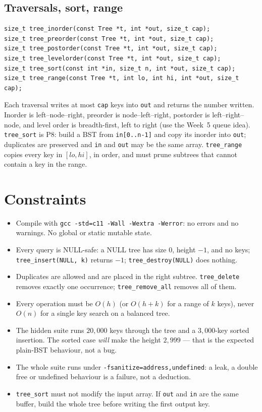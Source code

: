 \documentclass[11pt]{article}
\begin{document}
\subsection*{Traversals, sort, range}

\begin{verbatim}
size_t tree_inorder(const Tree *t, int *out, size_t cap);
size_t tree_preorder(const Tree *t, int *out, size_t cap);
size_t tree_postorder(const Tree *t, int *out, size_t cap);
size_t tree_levelorder(const Tree *t, int *out, size_t cap);
size_t tree_sort(const int *in, size_t n, int *out, size_t cap);
size_t tree_range(const Tree *t, int lo, int hi, int *out, size_t cap);
\end{verbatim}

Each traversal writes at most \texttt{cap} keys into \texttt{out} and returns the number written. Inorder is left--node--right, preorder is node--left--right, postorder is left--right--node, and level order is breadth-first, left to right (use the Week~5 queue idea). \texttt{tree\_sort} is P8: build a BST from \texttt{in[0..n-1]} and copy its inorder into \texttt{out}; duplicates are preserved and \texttt{in} and \texttt{out} may be the same array. \texttt{tree\_range} copies every key in $[lo,hi]$, in order, and must prune subtrees that cannot contain a key in the range.

\section{Constraints}

\begin{itemize}
  \item Compile with \texttt{gcc -std=c11 -Wall -Wextra -Werror}: no errors and no warnings. No global or static mutable state.
  \item Every query is NULL-safe: a NULL tree has size $0$, height $-1$, and no keys; \texttt{tree\_insert(NULL, k)} returns $-1$; \texttt{tree\_destroy(NULL)} does nothing.
  \item Duplicates are allowed and are placed in the right subtree. \texttt{tree\_delete} removes exactly one occurrence; \texttt{tree\_remove\_all} removes all of them.
  \item Every operation must be $O(h)$ (or $O(h+k)$ for a range of $k$ keys), never $O(n)$ for a single key search on a balanced tree.
  \item The hidden suite runs $20{,}000$ keys through the tree and a $3{,}000$-key sorted insertion. The sorted case \emph{will} make the height $2{,}999$ --- that is the expected plain-BST behaviour, not a bug.
  \item The whole suite runs under \texttt{-fsanitize=address,undefined}: a leak, a double free or undefined behaviour is a failure, not a deduction.
  \item \texttt{tree\_sort} must not modify the input array. If \texttt{out} and \texttt{in} are the same buffer, build the whole tree before writing the first output key.
\end{itemize}
\end{document}
